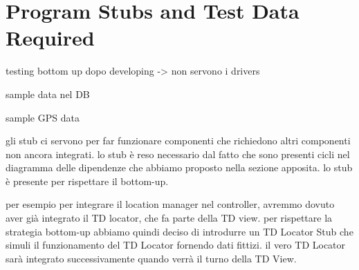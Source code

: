 \section{Program Stubs and Test Data Required}

testing bottom up dopo developing -> non servono i drivers

sample data nel DB

sample GPS data 

gli stub ci servono per far funzionare componenti che richiedono altri componenti non ancora integrati.
lo stub è reso necessario dal fatto che sono presenti cicli nel diagramma delle dipendenze che abbiamo proposto nella sezione apposita.
lo stub è presente per rispettare il bottom-up.

per esempio
per integrare il location manager nel controller, avremmo dovuto aver già integrato il TD locator, che fa parte della TD view.
per rispettare la strategia bottom-up abbiamo quindi deciso di introdurre un TD Locator Stub che simuli il funzionamento del TD Locator fornendo dati fittizi.
il vero TD Locator sarà integrato successivamente quando verrà il turno della TD View.